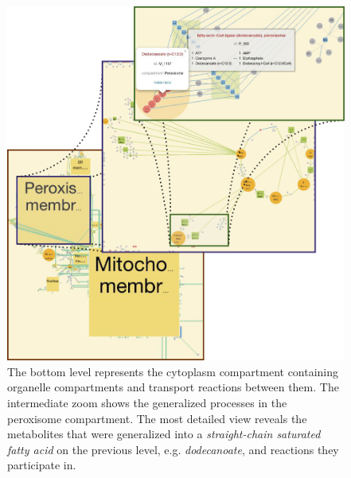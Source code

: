 \documentclass{bmcart}
\begin{document}
\begin{backmatter}
  \begin{figure}[h!]
 \includegraphics[scale=0.5]{figure1.png}
  \caption{
  \label{zoom_levels}
      The bottom level represents the cytoplasm compartment containing organelle compartments and transport reactions between them. The intermediate zoom shows the generalized processes in the peroxisome compartment. The most detailed view reveals the metabolites that were generalized into a \emph{straight-chain saturated fatty acid} on the previous level, e.g. \textit{dodecanoate}, and reactions they participate in.}
      \end{figure}




\end{backmatter}
\end{document}
